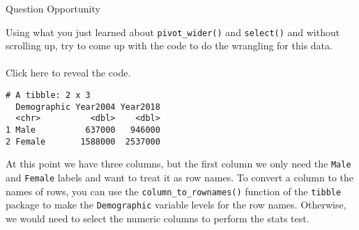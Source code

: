 \documentclass[
]{article}
\newenvironment{Shaded}{\begin{snugshade}}{\end{snugshade}}
\newcommand{\DataTypeTok}[1]{\textcolor[rgb]{0.13,0.29,0.53}{#1}}
\newcommand{\FloatTok}[1]{\textcolor[rgb]{0.00,0.00,0.81}{#1}}
\newcommand{\KeywordTok}[1]{\textcolor[rgb]{0.13,0.29,0.53}{\textbf{#1}}}
\newcommand{\NormalTok}[1]{#1}
\newcommand{\OperatorTok}[1]{\textcolor[rgb]{0.81,0.36,0.00}{\textbf{#1}}}
\newcommand{\StringTok}[1]{\textcolor[rgb]{0.31,0.60,0.02}{#1}}
\begin{document}
Question Opportunity

Using what you just learned about \texttt{pivot\_wider()} and
\texttt{select()} and without scrolling up, try to come up with the code
to do the wrangling for this data.

\hypertarget{section-43}{%
\paragraph{}\label{section-43}}

Click here to reveal the code.

\begin{Shaded}
\end{Shaded}

\begin{verbatim}
# A tibble: 2 x 3
  Demographic Year2004 Year2018
  <chr>          <dbl>    <dbl>
1 Male          637000   946000
2 Female       1588000  2537000
\end{verbatim}

At this point we have three columns, but the first column we only need
the \texttt{Male} and \texttt{Female} labels and want to treat it as row
names. To convert a column to the names of rows, you can use the
\texttt{column\_to\_rownames()} function of the \texttt{tibble} package
to make the \texttt{Demographic} variable levels for the row names.
Otherwise, we would need to select the numeric columns to perform the
stats test.

\begin{Shaded}
\end{Shaded}
\end{document}
